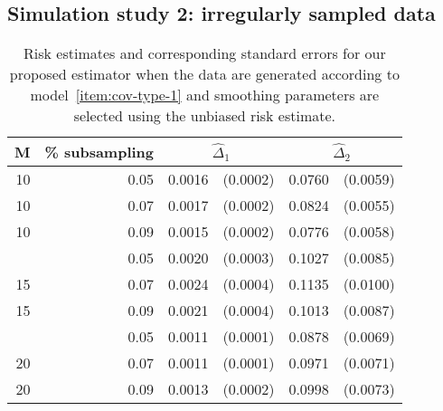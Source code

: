 \documentclass[12pt]{article}
\theoremstyle{definition}
\begin{document}

\subsection{Simulation study 2: irregularly sampled data}

\setlength{\dashlinedash}{0.5pt}
\setlength{\dashlinegap}{1pt}
\setlength{\arrayrulewidth}{0.2pt}

\begin{table}[H] \label{table:simulation-2-sigma-1}
\centering
\begin{tabular}{rrrrrr}
M & \% subsampling &  \multicolumn{2}{c}{$\hat{\Delta}_1$}  &  \multicolumn{2}{c}{$\hat{\Delta}_2$} \\ 
  \hline
10 & 0.05 & 0.0016 & (0.0002) & 0.0760 & (0.0059) \\ 
  10 & 0.07 & 0.0017 & (0.0002) & 0.0824 & (0.0055) \\ 
  10 & 0.09 & 0.0015 & (0.0002) & 0.0776 & (0.0058) \\ 
    \hdashline
  15 & 0.05 & 0.0020 & (0.0003) & 0.1027 & (0.0085) \\ 
  15 & 0.07 & 0.0024 & (0.0004) & 0.1135 & (0.0100) \\ 
  15 & 0.09 & 0.0021 & (0.0004) & 0.1013 & (0.0087) \\ 
    \hdashline
  20 & 0.05 & 0.0011 & (0.0001) & 0.0878 & (0.0069) \\ 
  20 & 0.07 & 0.0011 & (0.0001) & 0.0971 & (0.0071) \\ 
  20 & 0.09 & 0.0013 & (0.0002) & 0.0998 & (0.0073) \\ 
   \hline
\end{tabular}
\caption{Risk estimates and corresponding standard errors for our proposed estimator when the data are generated according to model~\ref{item:cov-type-1}  and smoothing parameters are selected using the unbiased risk estimate.} 
\end{table}
\end{document}
